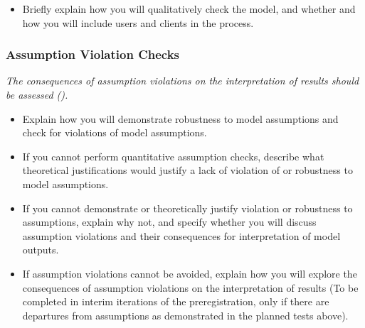\documentclass[
]{article}
\providecommand{\tightlist}{%
  \setlength{\itemsep}{0pt}\setlength{\parskip}{0pt}}
\begin{document}
\begin{tcolorbox}[enhanced jigsaw, opacitybacktitle=0.6, bottomrule=.15mm, leftrule=.75mm, rightrule=.15mm, colbacktitle=quarto-callout-caution-color!10!white, toprule=.15mm, titlerule=0mm, left=2mm, colframe=quarto-callout-caution-color-frame, breakable, title=\textcolor{quarto-callout-caution-color}{\faFire}\hspace{0.5em}{Preregistration Item}, opacityback=0, coltitle=black, bottomtitle=1mm, colback=white, toptitle=1mm, arc=.35mm]

\begin{itemize}
\tightlist
\item[$\square$]
  Briefly explain how you will qualitatively check the model, and
  whether and how you will include users and clients in the process.
\end{itemize}

\end{tcolorbox}

\subsubsection{Assumption Violation
Checks}\label{assumption-violation-checks}

\begin{tcolorbox}[enhanced jigsaw, opacitybacktitle=0.6, bottomrule=.15mm, leftrule=.75mm, rightrule=.15mm, colbacktitle=quarto-callout-caution-color!10!white, toprule=.15mm, titlerule=0mm, left=2mm, colframe=quarto-callout-caution-color-frame, breakable, title=\textcolor{quarto-callout-caution-color}{\faFire}\hspace{0.5em}{Preregistration Item}, opacityback=0, coltitle=black, bottomtitle=1mm, colback=white, toptitle=1mm, arc=.35mm]

\emph{The consequences of assumption violations on the interpretation of
results should be assessed ().}

\begin{itemize}
\tightlist
\item[$\square$]
  Explain how you will demonstrate robustness to model assumptions and
  check for violations of model assumptions.
\item[$\square$]
  If you cannot perform quantitative assumption checks, describe what
  theoretical justifications would justify a lack of violation of or
  robustness to model assumptions.
\item[$\square$]
  If you cannot demonstrate or theoretically justify violation or
  robustness to assumptions, explain why not, and specify whether you
  will discuss assumption violations and their consequences for
  interpretation of model outputs.
\item[$\square$]
  If assumption violations cannot be avoided, explain how you will
  explore the consequences of assumption violations on the
  interpretation of results (To be completed in interim iterations of
  the preregistration, only if there are departures from assumptions as
  demonstrated in the planned tests above).
\end{itemize}

\end{tcolorbox}
\end{document}
